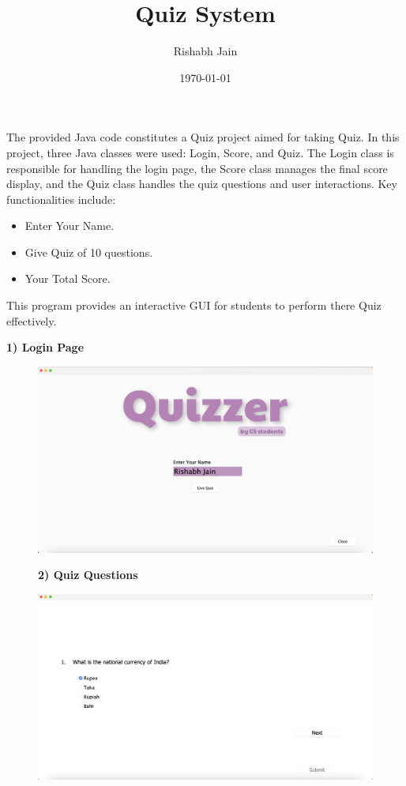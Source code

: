 \documentclass{article}
\title{Quiz System }
\author{Rishabh Jain}
\date{\today}
\begin{document}
\maketitle
The provided Java code constitutes a Quiz project aimed for taking Quiz.
In this project, three Java classes were used: Login, Score, and Quiz. The Login class is responsible for handling the login page, the Score class manages the final score display, and the Quiz class handles the quiz questions and user interactions.
Key functionalities include:
\begin{itemize}
\item Enter Your Name.
\item Give Quiz of 10 questions.
\item Your Total Score.
\end{itemize}
This program provides an interactive GUI for students to perform there Quiz effectively.
\begin{center}
\textbf{1) Login Page}
\end{center}
\begin{figure}[h]
\centering
\includegraphics[width=1.0\textwidth]{LoginImage.png}
\label{fig:Login Page}
\end{figure}
\begin{figure}[h]
\begin{center}
\textbf{2) Quiz Questions}
\end{center}
\centering
\includegraphics[width=1.0\textwidth]{QuizQue.png}
\label{fig:Quiz Questions}
\end{figure}
\end{document}
